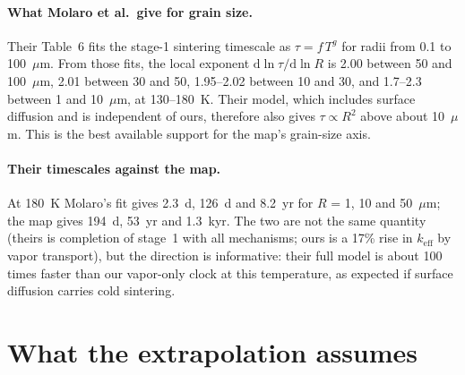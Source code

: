 \documentclass[11pt]{article}
\begin{document}
\paragraph{What Molaro et al.\ give for grain size.} Their Table~6 fits the
stage-1 sintering timescale as $\tau = f\,T^{g}$ for radii from 0.1 to
100~$\mu$m. From those fits, the local exponent
$\mathrm{d}\ln\tau/\mathrm{d}\ln R$ is 2.00 between 50 and 100~$\mu$m, 2.01
between 30 and 50, 1.95--2.02 between 10 and 30, and 1.7--2.3 between 1 and
10~$\mu$m, at 130--180~K. Their model, which includes surface diffusion and is
independent of ours, therefore also gives $\tau \propto R^{2}$ above about
10~$\mu$m. This is the best available support for the map's grain-size axis.

\paragraph{Their timescales against the map.} At 180~K Molaro's fit gives
2.3~d, 126~d and 8.2~yr for $R$ = 1, 10 and 50~$\mu$m; the map gives 194~d,
53~yr and 1.3~kyr. The two are not the same quantity (theirs is completion of
stage~1 with all mechanisms; ours is a 17\% rise in $k_{\mathrm{eff}}$ by vapor
transport), but the direction is informative: their full model is about 100
times faster than our vapor-only clock at this temperature, as expected if
surface diffusion carries cold sintering.

\section{What the extrapolation assumes}\label{sec:limits}
\end{document}
